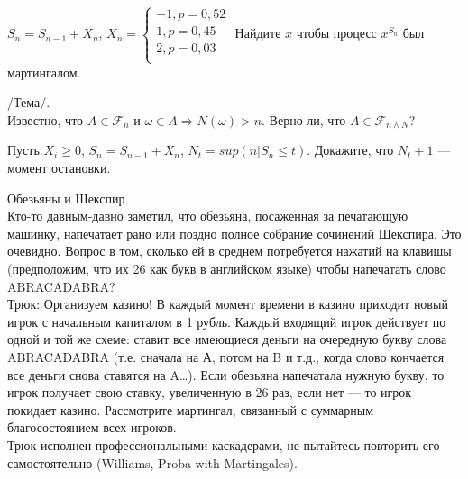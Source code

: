 \begin{problem}
 [Steele, 2.1.]
$S_{n}=S_{n-1}+X_{n}$,
$X_{n}=
\begin{cases}
	-1, p=0,52 \\
	1, p=0,45 \\
	2, p=0,03 \\
\end{cases} $
Найдите $x$ чтобы процесс $x^{S_{n}}$ был мартингалом.

\begin{sol}

\end{sol}
\end{problem}

\begin{problem}
 /Тема/. \\
Известно, что $A\in\mathcal{F}_{n}$ и $\omega\in A \Rightarrow
N(\omega)>n$. Верно ли, что $A \in \mathcal{F}_{n\wedge N}$?

\begin{sol}

\end{sol}
\end{problem}

\begin{problem}
Пусть $X_{i}\ge 0$, $S_{n}=S_{n-1}+X_{n}$, $N_{t}=sup(n|S_{n}\le
t)$. Докажите, что $N_{t}+1$ — момент остановки.

\begin{sol}

\end{sol}
\end{problem}

\begin{problem}
 Обезьяны и Шекспир \\
Кто-то давным-давно заметил, что обезьяна, посаженная за
печатающую машинку, напечатает рано или поздно полное собрание
сочинений Шекспира. Это очевидно. Вопрос в том, сколько ей в
среднем потребуется нажатий на клавишы (предположим, что их 26 как
букв в
английском языке) чтобы напечатать слово ABRACADABRA? \\
Трюк: Организуем казино! В каждый момент времени в казино приходит
новый игрок с начальным капиталом в 1 рубль. Каждый входящий игрок
действует по одной и той же схеме: ставит все имеющиеся деньги на
очередную букву слова ABRACADABRA (т.е. сначала на А, потом на B и
т.д., когда слово кончается все деньги снова ставятся на A\ldots).
Если обезьяна напечатала нужную букву, то игрок получает свою
ставку, увеличенную в 26 раз, если нет — то игрок покидает казино.
Рассмотрите мартингал, связанный с суммарным благосостоянием всех
игроков. \\
Трюк исполнен профессиональными каскадерами, не пытайтесь
повторить его самостоятельно (Williams, Proba with Martingales).

\begin{sol}

\end{sol}
\end{problem}

